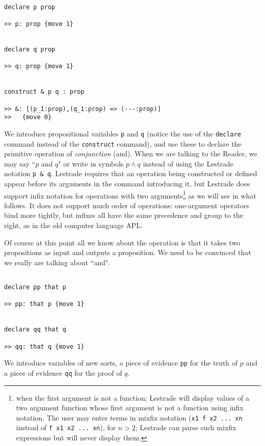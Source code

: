 \documentclass[12pt]{article}
\begin{document}
\begin{verbatim}

declare p prop

>> p: prop {move 1}


declare q prop

>> q: prop {move 1}


construct & p q : prop

>> &: [(p_1:prop),(q_1:prop) => (---:prop)]
>>   {move 0}

\end{verbatim}


We introduce propositional variables {\tt p} and {\tt q} (notice the use of the {\tt declare} command instead of the {\tt construct} command), and use these to declare the primitive operation of {\em conjunction} (and).  When we are talking to the Reader, we may say ``$p$ and $q$" or write in symbols $p \wedge q$ instead of using the Lestrade notation {\tt p \& q}.  Lestrade requires that an operation being constructed or defined appear before its arguments in the command introducing it, but Lestrade does support infix notation for operations with two arguments\footnote{when the first argument is not a function; Lestrade will display values of a two argument function whose first argument is not a function using infix notation.  The user may enter terms in mixfix notation ({\tt x1 f x2 ... xn} instead of {\tt f x1 x2 ... xn}), for $n>2$; Lestrade can parse such mixfix expressions but will never display them.} as we will see in what follows.  It does not support much order of operations:  one-argument operators bind more tightly, but infixes all have the same precedence and group to the right, as in the old computer language APL.

Of course at this point all we know about the operation is that it takes two propositions as input and outputs a proposition.   We need to be convinced that we really are talking about ``and".

\begin{verbatim}

declare pp that p

>> pp: that p {move 1}


declare qq that q

>> qq: that q {move 1}

\end{verbatim}

We introduce variables of new sorts, a piece of evidence {\tt pp} for the truth of $p$ and a piece of evidence {\tt qq} for the proof of $q$.
\end{document}
